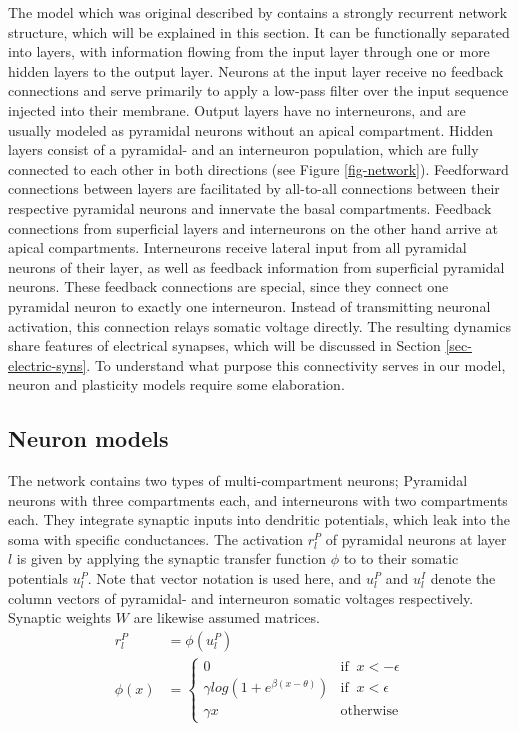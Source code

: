 The model which was original described by \cite{sacramento2018dendritic} contains a strongly recurrent network
structure, which will be explained in this section. It can be functionally separated into layers, with information
flowing from the input layer through one or more hidden layers to the output layer. Neurons at the input layer receive
no feedback connections and serve primarily to apply a low-pass filter over the input sequence injected into their
membrane. Output layers have no interneurons, and are usually modeled as pyramidal neurons without an apical
compartment. Hidden layers consist of a pyramidal- and an interneuron population, which are fully connected to each
other in both directions (see Figure \ref{fig-network}). Feedforward connections between layers are facilitated by
all-to-all connections between their respective pyramidal neurons and innervate the basal compartments. Feedback
connections from superficial layers and interneurons on the other hand arrive at apical compartments. Interneurons
receive lateral input from all pyramidal neurons of their layer, as well as feedback information from superficial
pyramidal neurons. These feedback connections are special, since they connect one pyramidal neuron to exactly one
interneuron. Instead of transmitting neuronal activation, this connection relays somatic voltage directly. The resulting
dynamics share features of electrical synapses, which will be discussed in Section \ref{sec-electric-syns}. To
understand what purpose this connectivity serves in our model, neuron and plasticity models require some elaboration.


\subsection{Neuron models}\label{sec-neurons}



The network contains two types of multi-compartment neurons; Pyramidal neurons with three compartments each, and
interneurons with two compartments each. They integrate synaptic inputs into dendritic potentials, which leak into the
soma with specific conductances. The activation $r_l^P$ of pyramidal neurons at layer $l$ is given by applying the
synaptic transfer function $\phi$ to to their somatic potentials $u_l^P$. Note that vector notation is used here, and
$u_l^P$ and $u_l^I$ denote the column vectors of pyramidal- and interneuron somatic voltages respectively. Synaptic
weights $W$ are likewise assumed matrices.
\begin{align}
  r_l^P   & = \phi(u_l^P)                                                      \\
  \phi(x) & = \begin{cases}
                0                                 & \textrm{if } \ x < -\epsilon \\
                \gamma log(1+e^{\beta(x-\theta)}) & \textrm{if } \ x < \epsilon  \\
                \gamma x                          & \textrm{otherwise}
              \end{cases}
\end{align}

